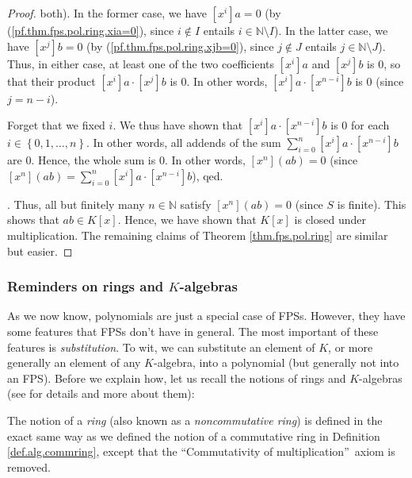 \begin{proof}
{both). In the former case, we have $\left[  x^{i}\right]  a=0$ (by
(\ref{pf.thm.fps.pol.ring.xia=0}), since $i\notin I$ entails $i\in
\mathbb{N}\setminus I$). In the latter case, we have $\left[  x^{j}\right]
b=0$ (by (\ref{pf.thm.fps.pol.ring.xjb=0}), since $j\notin J$ entails
$j\in\mathbb{N}\setminus J$). Thus, in either case, at least one of the two
coefficients $\left[  x^{i}\right]  a$ and $\left[  x^{j}\right]  b$ is $0$,
so that their product $\left[  x^{i}\right]  a\cdot\left[  x^{j}\right]  b$ is
$0$. In other words, $\left[  x^{i}\right]  a\cdot\left[  x^{n-i}\right]  b$
is $0$ (since $j=n-i$).
\par
Forget that we fixed $i$. We thus have shown that $\left[  x^{i}\right]
a\cdot\left[  x^{n-i}\right]  b$ is $0$ for each $i\in\left\{  0,1,\ldots
,n\right\}  $. In other words, all addends of the sum $\sum_{i=0}^{n}\left[
x^{i}\right]  a\cdot\left[  x^{n-i}\right]  b$ are $0$. Hence, the whole sum
is $0$. In other words, $\left[  x^{n}\right]  \left(  ab\right)  =0$ (since
$\left[  x^{n}\right]  \left(  ab\right)  =\sum_{i=0}^{n}\left[  x^{i}\right]
a\cdot\left[  x^{n-i}\right]  b$), qed.}. Thus, all but finitely many
$n\in\mathbb{N}$ satisfy $\left[  x^{n}\right]  \left(  ab\right)  =0$ (since
$S$ is finite). This shows that $ab\in K\left[  x\right]  $. Hence, we have
shown that $K\left[  x\right]  $ is closed under multiplication. The remaining
claims of Theorem \ref{thm.fps.pol.ring} are similar but easier.
\end{proof}

\subsubsection{Reminders on rings and $K$-algebras}

As we now know, polynomials are just a special case of FPSs. However, they
have some features that FPSs don't have in general. The most important of
these features is \emph{substitution}. To wit, we can substitute an element of
$K$, or more generally an element of any $K$-algebra, into a polynomial (but
generally not into an FPS). Before we explain how, let us recall the notions
of rings and $K$-algebras (see \cite[Chapter 2 and \S 3.11]{23wa} for details
and more about them):

\begin{definition}
\label{def.alg.ring}The notion of a \emph{ring} (also known as a
\emph{noncommutative ring}) is defined in the exact same way as we defined the
notion of a commutative ring in Definition \ref{def.alg.commring}, except that
the \textquotedblleft Commutativity of multiplication\textquotedblright\ axiom
is removed.
\end{definition}

